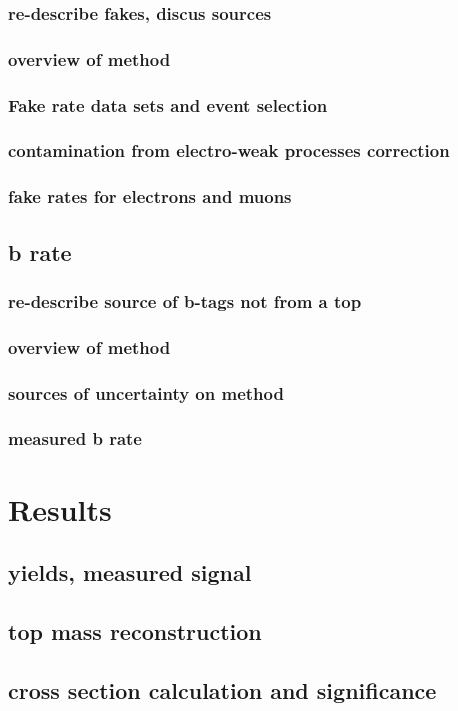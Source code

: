 \documentclass[12pt,chapterheads,oneside]{ucsd}
\begin{document}
        		\subsection{re-describe fakes, discus sources}
       		\subsection{overview of method}
        		\subsection{Fake rate data sets and event selection}
        		\subsection{contamination from electro-weak processes correction}
        		\subsection{fake rates for electrons and muons}
	\section{b rate}
        		\subsection{re-describe source of b-tags not from a top}
        		\subsection{overview of method}
        		\subsection{sources of uncertainty on method}
        		\subsection{measured b rate}






\chapter{Results}
	\section{yields, measured signal}
	\section{top mass reconstruction}
	\section{cross section calculation and significance}
   






\appendix
\end{document}
